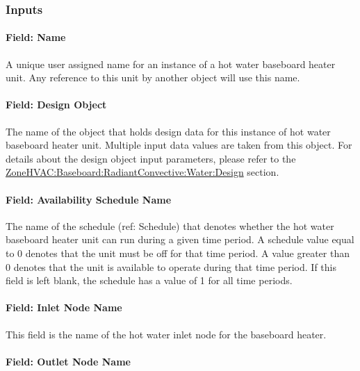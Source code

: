 \subsubsection{Inputs}\label{inputs-038}

\paragraph{Field: Name}\label{field-name-037}

A unique user assigned name for an instance of a hot water baseboard heater unit. Any reference to this unit by another object will use this name.

\paragraph{Field: Design Object}\label{HW_Baseboard_DesignObjectName}

The name of the object that holds design data for this instance of hot water baseboard heater unit. Multiple input data values are taken from this object.  For details about the design object input parameters, please refer to the \hyperref[zonehvac-baseboard-radiantconvective-water-design] {ZoneHVAC:Baseboard:RadiantConvective:Water:Design} section.

\paragraph{Field: Availability Schedule Name}\label{field-availability-schedule-name-013}

The name of the schedule (ref: Schedule) that denotes whether the hot water baseboard heater unit can run during a given time period. A schedule value equal to 0 denotes that the unit must be off for that time period. A value greater than 0 denotes that the unit is available to operate during that time period. If this field is left blank, the schedule has a value of 1 for all time periods.

\paragraph{Field: Inlet Node Name}\label{field-inlet-node-name-006}

This field is the name of the hot water inlet node for the baseboard heater.

\paragraph{Field: Outlet Node Name}\label{field-outlet-node-name-007}

